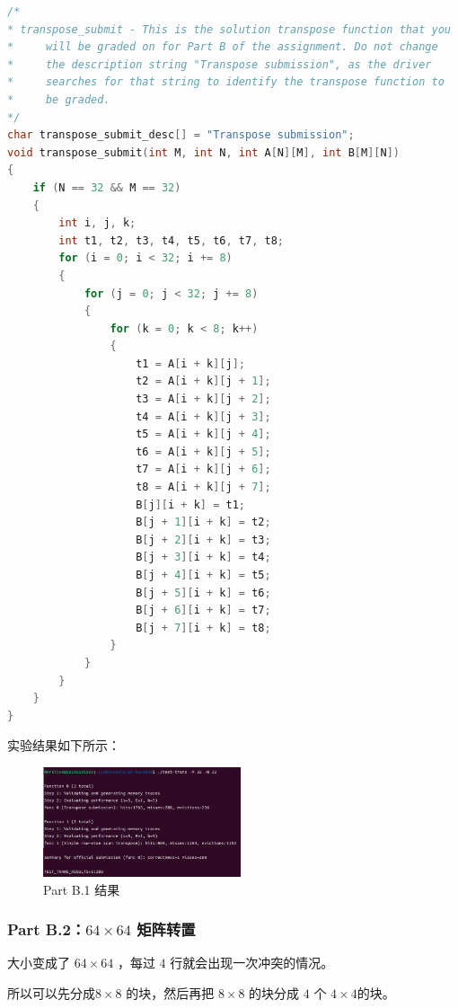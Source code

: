 \begin{lstlisting}[language = C,title= Matrix Transpose]
/* 
* transpose_submit - This is the solution transpose function that you
*     will be graded on for Part B of the assignment. Do not change
*     the description string "Transpose submission", as the driver
*     searches for that string to identify the transpose function to
*     be graded. 
*/
char transpose_submit_desc[] = "Transpose submission";
void transpose_submit(int M, int N, int A[N][M], int B[M][N])
{
    if (N == 32 && M == 32)
    {
        int i, j, k;
        int t1, t2, t3, t4, t5, t6, t7, t8;
        for (i = 0; i < 32; i += 8)
        {
            for (j = 0; j < 32; j += 8)
            {
                for (k = 0; k < 8; k++)
                {
                    t1 = A[i + k][j];
                    t2 = A[i + k][j + 1];
                    t3 = A[i + k][j + 2];
                    t4 = A[i + k][j + 3];
                    t5 = A[i + k][j + 4];
                    t6 = A[i + k][j + 5];
                    t7 = A[i + k][j + 6];
                    t8 = A[i + k][j + 7];
                    B[j][i + k] = t1;
                    B[j + 1][i + k] = t2;
                    B[j + 2][i + k] = t3;
                    B[j + 3][i + k] = t4;
                    B[j + 4][i + k] = t5;
                    B[j + 5][i + k] = t6;
                    B[j + 6][i + k] = t7;
                    B[j + 7][i + k] = t8;
                }
            }
        }
    }
}
\end{lstlisting}

实验结果如下所示：
\begin{figure} [H]
    \centering
    \includegraphics[width=0.52\textwidth]{PartB1.png}
    \caption{Part B.1 结果}
\end{figure}

\subsubsection{Part B.2：$ 64 \times 64 $ 矩阵转置}
大小变成了  $64 \times 64$ ，每过 $4$ 行就会出现一次冲突的情况。

所以可以先分成$ 8 \times 8 $ 的块，然后再把 $8 \times 8$ 的块分成 $4$ 个 $4 \times 4 $的块。

